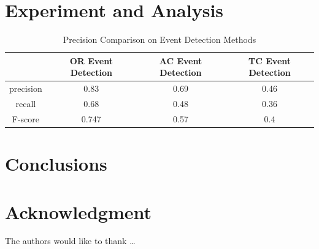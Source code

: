 \blindmathtrue
\blindmathfalse
\blinddescription

\qwuMarker %

\section{Experiment and Analysis} \label{sec-experiment}


\begin{table}  \centering
  \caption{Precision Comparison on Event Detection Methods}
  \label{tbl:overall-experiments}
  \begin{tabular}{cccc}
\toprule
    & OR Event Detection & AC Event Detection & TC Event Detection \\
\midrule
    precision & 0.83 & 0.69 & 0.46 \\
    recall & 0.68 & 0.48 & 0.36 \\
    F-score & 0.747 & 0.57 & 0.4 \\
\bottomrule
\end{tabular}
\end{table}


\section{Conclusions} \label{sec-conclusions}

\blindtext

\section*{Acknowledgment}

\lipsum[1]


The authors would like to thank \ldots

